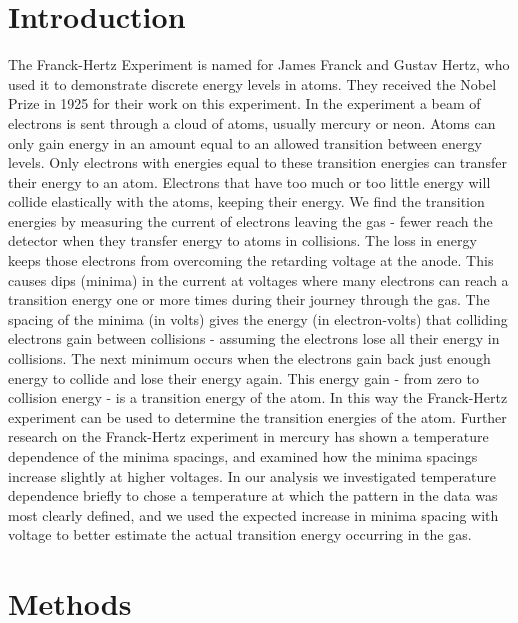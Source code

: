 \documentclass[prb,preprint]{revtex4-1}
\begin{document}
\maketitle

\section{Introduction} 

The Franck-Hertz Experiment is named for James Franck and Gustav Hertz, who used it to demonstrate discrete energy levels in atoms. 
They received the Nobel Prize in 1925 for their work on this experiment. 
In the experiment a beam of electrons is sent through a cloud of atoms, usually mercury or neon. 
Atoms can only gain energy in an amount equal to an allowed transition between energy levels. 
Only electrons with energies equal to these transition energies can transfer their energy to an atom. 
Electrons that have too much or too little energy will collide elastically with the atoms, keeping their energy. 
We find the transition energies by measuring the current of electrons leaving the gas - fewer reach the detector when they transfer energy to atoms in collisions. 
The loss in energy keeps those electrons from overcoming the retarding voltage at the anode. 
This causes dips (minima) in the current at voltages where many electrons can reach a transition energy one or more times during their journey through the gas. 
The spacing of the minima (in volts) gives the energy (in electron-volts) that colliding electrons gain between collisions - assuming the electrons lose all their energy in collisions. 
The next minimum occurs when the electrons gain back just enough energy to collide and lose their energy again. 
This energy gain - from zero to collision energy - is a transition energy of the atom. 
In this way the Franck-Hertz experiment can be used to determine the transition energies of the atom. 
Further research on the Franck-Hertz experiment in mercury has shown a temperature dependence of the minima spacings, and examined how the minima spacings increase slightly at higher voltages. 
In our analysis we investigated temperature dependence briefly to chose a temperature at which the pattern in the data was most clearly defined, and we used the expected increase in minima spacing with voltage to better estimate the actual transition energy occurring in the gas. 


\section{Methods}
\end{document}
